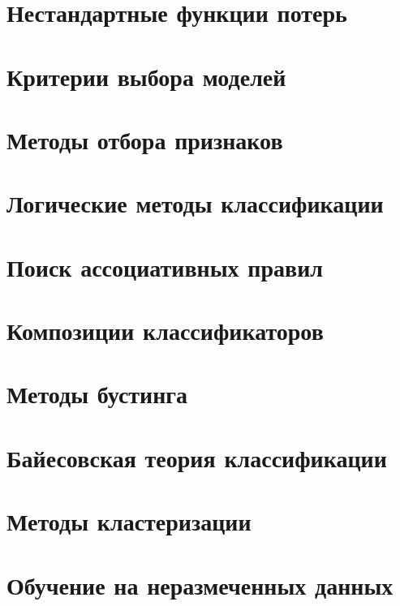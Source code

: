 \documentclass{mybook}
\begin{document}
    \chapter{Нестандартные функции потерь}
    

    \clearpage
    \chapter{Критерии выбора моделей}
    

    \clearpage
    \chapter{Методы отбора признаков}
    

    \clearpage
    \chapter{Логические методы классификации}
    

    \clearpage
    \chapter{Поиск ассоциативных правил}
    

    \clearpage
    \chapter{Композиции классификаторов}
    

    \clearpage
    \chapter{Методы бустинга}
    

    \clearpage
    \chapter{Байесовская теория классификации}
    

    \clearpage
    \chapter{Методы кластеризации}
    

    \clearpage
    \chapter{Обучение на неразмеченных данных}
    

    \clearpage
    \printbibliography
\end{document}
